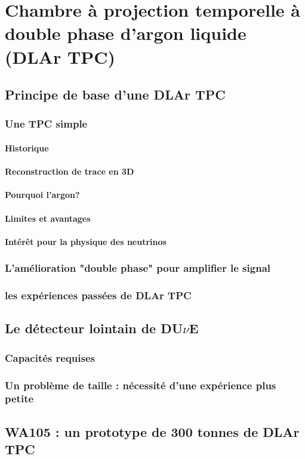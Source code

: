 \chapter[DLAr TPC]{Chambre à projection temporelle à double phase d'argon liquide (DLAr TPC)}

    \lipsum[1]
    \newpage

    \section{Principe de base d'une DLAr TPC}
        \subsection{Une TPC simple}
            \subsubsection{Historique}
            \subsubsection{Reconstruction de trace en 3D}
            \subsubsection{Pourquoi l'argon?}
            \subsubsection{Limites et avantages}
            \subsubsection{Intérêt pour la physique des neutrinos}
        \subsection{L'amélioration "double phase" pour amplifier le signal}
        \subsection{les expériences passées de DLAr TPC}
        
    \section{Le détecteur lointain de DU$\nu$E}
        \subsection{Capacités requises}
        \subsection{Un problème de taille : nécessité d'une expérience plus petite} 
        
    \section{WA105 : un prototype de 300 tonnes de DLAr TPC}
        
\printbibliography